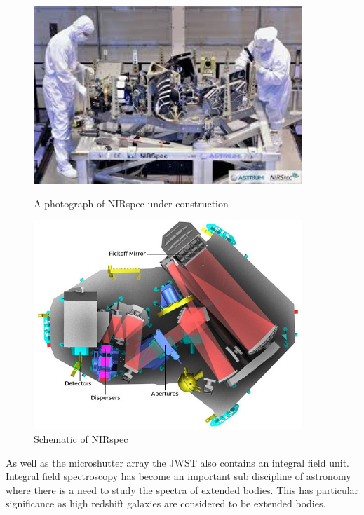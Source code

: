 			\begin{figure}[htbp]
				\begin{minipage}[c]{0.5\linewidth}
					\centering
					\includegraphics[width=0.9\textwidth]{../Images/nirspec_construction.jpeg}
					\caption{\label{fig:nirspec_construction} A photograph of NIRspec under construction}
				\end{minipage}
				\begin{minipage}[c]{0.5\linewidth}
					\centering
					\includegraphics[width=0.9\textwidth]{../Images/nirspec_mirrors.jpeg}
					\caption{\label{fig:nirspec_mirrors} Schematic of NIRspec}
				\end{minipage}
			\end{figure}

			As well as the microshutter array the JWST also contains an integral field unit. Integral field spectroscopy has become an important sub discipline of astronomy where there is a need to study the spectra of extended bodies. This has particular significance as high redshift galaxies are considered to be extended bodies.

